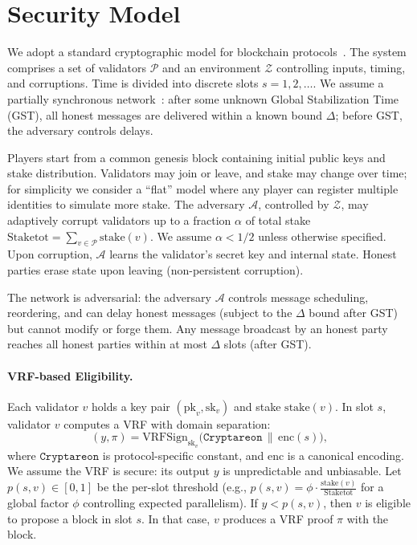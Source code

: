 \documentclass[11pt]{article}
\newcommand{\cZ}{\ensuremath{\mathscr{Z}}\xspace}
\newcommand{\cA}{\ensuremath{\mathscr{A}}\xspace}
\newcommand{\cP}{\ensuremath{\mathscr{P}}\xspace}
\newcommand{\pk}{\ensuremath{\mathrm{pk}}\xspace}
\newcommand{\sk}{\ensuremath{\mathrm{sk}}\xspace}
\newcommand{\stake}{\ensuremath{\mathrm{stake}}\xspace}
\newcommand{\StakeTot}{\ensuremath{\mathrm{Stake}{\mathrm{tot}}}\xspace}
\newcommand{\stakefrac}[1]{\ensuremath{\frac{\stake(#1)}{\StakeTot}}\xspace}
\newcommand{\VRFSign}{\ensuremath{\mathrm{VRFSign}}\xspace}
\newcommand{\domsep}{\ensuremath{\mathtt{Cryptareon}}\xspace}
\newcommand{\Encode}{\ensuremath{\mathrm{enc}}\xspace}
\begin{document}
\section{Security Model}
\label{sec:model}

We adopt a standard cryptographic model for blockchain protocols~\cite{EC:GarKiaLeo15,EC:PasSeeShe17,JC:Canetti00}. The system comprises a set of validators $\cP$ and an environment $\cZ$ controlling inputs, timing, and corruptions. Time is divided into discrete slots $s=1,2,\ldots$. We assume a partially synchronous network~\cite{DLS88,EC:PasSeeShe17}: after some unknown Global Stabilization Time (GST), all honest messages are delivered within a known bound $\Delta$; before GST, the adversary controls delays.

Players start from a common genesis block containing initial public keys and stake distribution. Validators may join or leave, and stake may change over time; for simplicity we consider a “flat” model where any player can register multiple identities to simulate more stake. The adversary $\cA$, controlled by $\cZ$, may adaptively corrupt validators up to a fraction $\alpha$ of total stake $\StakeTot=\sum_{v\in\cP}\stake(v)$. We assume $\alpha < 1/2$ unless otherwise specified. Upon corruption, $\cA$ learns the validator's secret key and internal state. Honest parties erase state upon leaving (non-persistent corruption).

The network is adversarial: the adversary $\cA$ controls message scheduling, reordering, and can delay honest messages (subject to the $\Delta$ bound after GST) but cannot modify or forge them. Any message broadcast by an honest party reaches all honest parties within at most $\Delta$ slots (after GST).

\paragraph{VRF-based Eligibility.} Each validator $v$ holds a key pair $(\pk_v,\sk_v)$ and stake $\stake(v)$. In slot $s$, validator $v$ computes a VRF with domain separation:
\begin{equation*}
(y,\pi) = \VRFSign_{\sk_v}\bigl(\domsep \,\|\,\Encode(s)\bigr),
\end{equation*}
where $\domsep$ is protocol-specific constant, and $\Encode$ is a canonical encoding. We assume the VRF is secure: its output $y$ is unpredictable and unbiasable. Let $p(s,v)\in[0,1]$ be the per-slot threshold (e.g., $p(s,v) = \phi\cdot \stakefrac{v}$ for a global factor $\phi$ controlling expected parallelism). If $y < p(s,v)$, then $v$ is eligible to propose a block in slot $s$. In that case, $v$ produces a VRF proof $\pi$ with the block.
\end{document}
